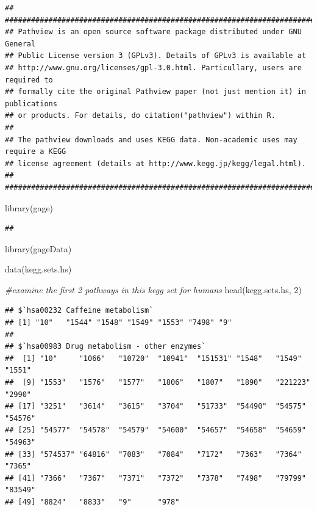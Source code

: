 \documentclass[
]{article}
\newenvironment{Shaded}{\begin{snugshade}}{\end{snugshade}}
\newcommand{\CommentTok}[1]{\textcolor[rgb]{0.56,0.35,0.01}{\textit{#1}}}
\newcommand{\DecValTok}[1]{\textcolor[rgb]{0.00,0.00,0.81}{#1}}
\newcommand{\FunctionTok}[1]{\textcolor[rgb]{0.00,0.00,0.00}{#1}}
\newcommand{\NormalTok}[1]{#1}
\begin{document}
\begin{verbatim}
## ##############################################################################
## Pathview is an open source software package distributed under GNU General
## Public License version 3 (GPLv3). Details of GPLv3 is available at
## http://www.gnu.org/licenses/gpl-3.0.html. Particullary, users are required to
## formally cite the original Pathview paper (not just mention it) in publications
## or products. For details, do citation("pathview") within R.
## 
## The pathview downloads and uses KEGG data. Non-academic uses may require a KEGG
## license agreement (details at http://www.kegg.jp/kegg/legal.html).
## ##############################################################################
\end{verbatim}

\begin{Shaded}
\begin{Highlighting}[]
\FunctionTok{library}\NormalTok{(gage)}
\end{Highlighting}
\end{Shaded}

\begin{verbatim}
## 
\end{verbatim}

\begin{Shaded}
\begin{Highlighting}[]
\FunctionTok{library}\NormalTok{(gageData)}

\FunctionTok{data}\NormalTok{(kegg.sets.hs)}

\CommentTok{\#examine the first 2 pathways in this kegg set for humans}
\FunctionTok{head}\NormalTok{(kegg.sets.hs, }\DecValTok{2}\NormalTok{)}
\end{Highlighting}
\end{Shaded}

\begin{verbatim}
## $`hsa00232 Caffeine metabolism`
## [1] "10"   "1544" "1548" "1549" "1553" "7498" "9"   
## 
## $`hsa00983 Drug metabolism - other enzymes`
##  [1] "10"     "1066"   "10720"  "10941"  "151531" "1548"   "1549"   "1551"  
##  [9] "1553"   "1576"   "1577"   "1806"   "1807"   "1890"   "221223" "2990"  
## [17] "3251"   "3614"   "3615"   "3704"   "51733"  "54490"  "54575"  "54576" 
## [25] "54577"  "54578"  "54579"  "54600"  "54657"  "54658"  "54659"  "54963" 
## [33] "574537" "64816"  "7083"   "7084"   "7172"   "7363"   "7364"   "7365"  
## [41] "7366"   "7367"   "7371"   "7372"   "7378"   "7498"   "79799"  "83549" 
## [49] "8824"   "8833"   "9"      "978"
\end{verbatim}
\end{document}
